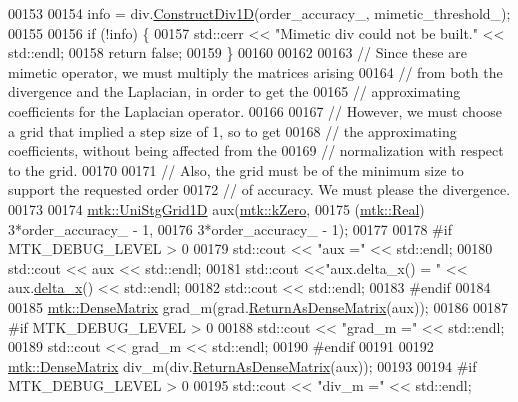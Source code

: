 \begin{DoxyCode}
00153 
00154   info = div.\hyperlink{classmtk_1_1Div1D_a52fcd1542f11e606e36bd188e48bfdf7}{ConstructDiv1D}(order\_accuracy\_, mimetic\_threshold\_);
00155 
00156   \textcolor{keywordflow}{if} (!info) \{
00157     std::cerr << \textcolor{stringliteral}{"Mimetic div could not be built."} << std::endl;
00158     \textcolor{keywordflow}{return} \textcolor{keyword}{false};
00159   \}
00160 
00162 
00163   \textcolor{comment}{// Since these are mimetic operator, we must multiply the matrices arising}
00164   \textcolor{comment}{// from both the divergence and the Laplacian, in order to get the}
00165   \textcolor{comment}{// approximating coefficients for the Laplacian operator.}
00166 
00167   \textcolor{comment}{// However, we must choose a grid that implied a step size of 1, so to get}
00168   \textcolor{comment}{// the approximating coefficients, without being affected from the}
00169   \textcolor{comment}{// normalization with respect to the grid.}
00170 
00171   \textcolor{comment}{// Also, the grid must be of the minimum size to support the requested order}
00172   \textcolor{comment}{// of accuracy. We must please the divergence.}
00173 
00174   \hyperlink{classmtk_1_1UniStgGrid1D}{mtk::UniStgGrid1D} aux(\hyperlink{group__c01-roots_ga59a451a5fae30d59649bcda274fea271}{mtk::kZero},
00175                         (\hyperlink{group__c01-roots_gac080bbbf5cbb5502c9f00405f894857d}{mtk::Real}) 3*order\_accuracy\_ - 1,
00176                         3*order\_accuracy\_ - 1);
00177 
00178 \textcolor{preprocessor}{  #if MTK\_DEBUG\_LEVEL > 0}
00179   std::cout << \textcolor{stringliteral}{"aux ="} << std::endl;
00180   std::cout << aux << std::endl;
00181   std::cout <<\textcolor{stringliteral}{"aux.delta\_x() = "} << aux.\hyperlink{classmtk_1_1UniStgGrid1D_a6e7173b01241632cf509496d66b9f74c}{delta\_x}() << std::endl;
00182   std::cout << std::endl;
00183 \textcolor{preprocessor}{  #endif}
00184 
00185   \hyperlink{classmtk_1_1DenseMatrix}{mtk::DenseMatrix} grad\_m(grad.\hyperlink{classmtk_1_1Grad1D_a4218516bfb43f683559322ea97058c78}{ReturnAsDenseMatrix}(aux));
00186 
00187 \textcolor{preprocessor}{  #if MTK\_DEBUG\_LEVEL > 0}
00188   std::cout << \textcolor{stringliteral}{"grad\_m ="} << std::endl;
00189   std::cout << grad\_m << std::endl;
00190 \textcolor{preprocessor}{  #endif}
00191 
00192   \hyperlink{classmtk_1_1DenseMatrix}{mtk::DenseMatrix} div\_m(div.\hyperlink{classmtk_1_1Div1D_afdbb1e11f05dd77b882f36426229acf7}{ReturnAsDenseMatrix}(aux));
00193 
00194 \textcolor{preprocessor}{  #if MTK\_DEBUG\_LEVEL > 0}
00195   std::cout << \textcolor{stringliteral}{"div\_m ="} << std::endl;

\end{DoxyCode}
